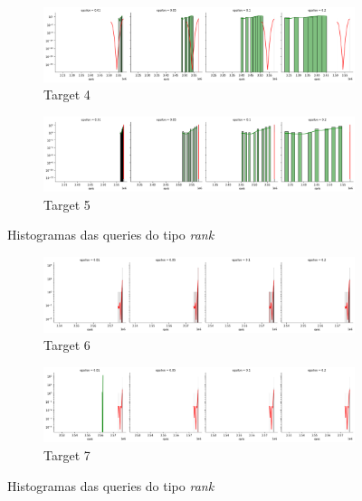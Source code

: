 \documentclass[11pt]{article}
\begin{document}
  \begin{figure}[H]
    \begin{subfigure}{.5\textwidth}
      \centering
      \includegraphics[width=.9\linewidth]{../../img/qdigest-histograma_distrib_RANK_t_4.png}
      \caption{Target 4}
      \label{fig:sub-first}
    \end{subfigure}
    \begin{subfigure}{.5\textwidth}
      \centering
      \includegraphics[width=.9\linewidth]{../../img/qdigest-histograma_distrib_RANK_t_5.png}
      \caption{Target 5}
    \end{subfigure}
    \caption{Histogramas das queries do tipo \emph{rank}}
    \end{figure}

    \begin{figure}[H]
      \begin{subfigure}{.5\textwidth}
        \centering
        \includegraphics[width=.9\linewidth]{../../img/qdigest-histograma_distrib_RANK_t_6.png}
        \caption{Target 6}
        \label{fig:sub-first}
      \end{subfigure}
      \begin{subfigure}{.5\textwidth}
        \centering
        \includegraphics[width=.9\linewidth]{../../img/qdigest-histograma_distrib_RANK_t_7.png}
        \caption{Target 7}
      \end{subfigure}
      \caption{Histogramas das queries do tipo \emph{rank}}
      \end{figure}
      
\end{document}
